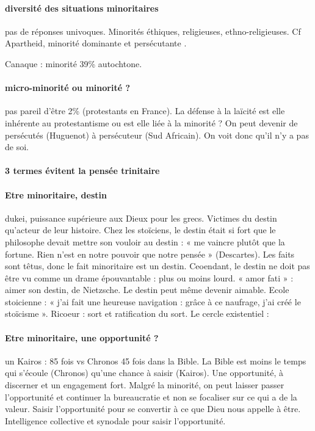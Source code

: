\paragraph{diversité des situations minoritaires} pas de réponses univoques. Minorités éthiques, religieuses, ethno-religieuses. Cf Apartheid, minorité dominante et persécutante .
\begin{Ex}
Canaque : minorité 39\% autochtone.
\end{Ex}
\paragraph{micro-minorité ou minorité ?} pas pareil d’être 2\% (protestants en France). La défense  à la laïcité est elle inhérente au protestantisme ou est elle liée à la minorité ?
On peut devenir de persécutés (Huguenot) à persécuteur (Sud Africain).
On voit donc qu’il n’y a pas de soi.

\paragraph{3 termes évitent la pensée trinitaire}

\paragraph{Etre minoritaire, destin} dukei, puissance supérieure aux Dieux pour les grecs. Victimes du destin qu’acteur de leur histoire. Chez les stoïciens, le destin était si fort que le philosophe devait mettre son vouloir au destin : « me vaincre plutôt que la fortune. Rien n’est en notre pouvoir que notre pensée » (Descartes). 
Les faits sont têtus, donc le fait minoritaire est un destin. Ceoendant, le destin ne doit pas être vu comme un drame épouvantable : plus ou moins lourd. « amor fati » : aimer son destin, de Nietzsche. Le destin peut même devenir aimable. Ecole stoicienne : « j’ai fait une heureuse navigation : grâce à ce naufrage, j’ai créé le stoïcisme ». Ricoeur : sort et ratification du sort. Le cercle existentiel : 
\paragraph{Etre minoritaire, une opportunité ?} un Kairos : 85 fois vs Chronos 45 fois dans la Bible. La Bible est moins le temps qui s’écoule (Chronos) qu’une chance à saisir (Kairos).  Une opportunité, à discerner et un engagement fort. 
Malgré la minorité, on peut laisser passer l’opportunité et continuer la bureaucratie et non se focaliser sur ce qui a de la valeur. Saisir l’opportunité pour se convertir à ce que Dieu nous appelle à être. Intelligence collective et synodale pour saisir l’opportunité. 
